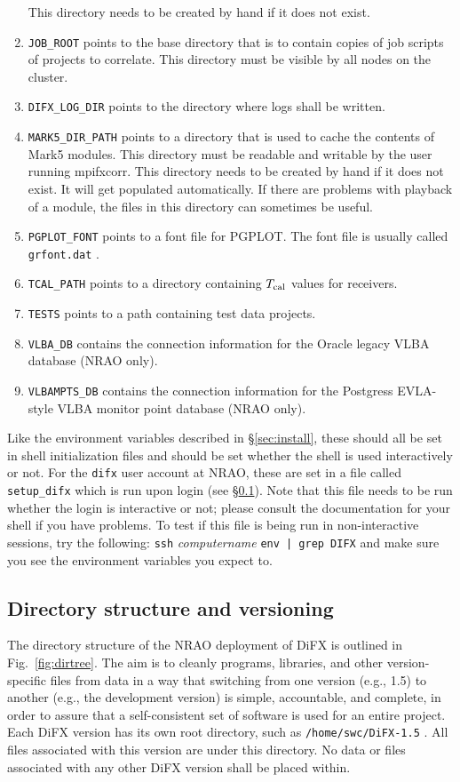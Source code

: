 \begin{enumerate}
This directory needs to be created by hand if it does not exist.
\item {\tt JOB\_ROOT} points to the base directory that is to contain copies of job scripts of projects to correlate.
This directory must be visible by all nodes on the cluster.
\item {\tt DIFX\_LOG\_DIR} points to the directory where logs shall be written. \difxoneone
\item {\tt MARK5\_DIR\_PATH} points to a directory that is used to cache the contents of Mark5 modules.
This directory must be readable and writable by the user running mpifxcorr.
This directory needs to be created by hand if it does not exist.  
It will get populated automatically.
If there are problems with playback of a module, the files in this directory can sometimes be useful.
\item {\tt PGPLOT\_FONT} points to a font file for PGPLOT.
The font file is usually called {\tt grfont.dat} .
\item {\tt TCAL\_PATH} points to a directory containing $T_{\rm cal}$ values for receivers.
\item {\tt TESTS} points to a path containing test data projects.
\item {\tt VLBA\_DB} contains the connection information for the Oracle legacy VLBA database (NRAO only).
\item {\tt VLBAMPTS\_DB} contains the connection information for the Postgress EVLA-style VLBA monitor point database (NRAO only).
\end{enumerate}
Like the environment variables described in \S\ref{sec:install}, these should all be set in shell initialization files and should be set whether the shell is used interactively or not.
For the {\tt difx} user account at NRAO, these are set in a file called {\tt setup\_difx} which is run upon login (see \S\ref{sec:versions}).
Note that this file needs to be run whether the login is interactive or not; please consult the documentation for your shell if you have problems.
To test if this file is being run in non-interactive sessions, try the following: {\tt ssh} {\em computername} {\tt env | grep DIFX} and make sure you see the environment variables you expect to.


\subsection{Directory structure and versioning} \label{sec:versions}

The directory structure of the NRAO deployment of DiFX is outlined in Fig.~\ref{fig:dirtree}.
The aim is to cleanly programs, libraries, and other version-specific files from data in a way that switching from one version (e.g., 1.5) to another (e.g., the development version) is simple, accountable, and complete, in order to assure that a self-consistent set of software is used for an entire project.
Each DiFX version has its own root directory, such as {\tt /home/swc/DiFX-1.5} .
All files associated with this version are under this directory.
No data or files associated with any other DiFX version shall be placed within.

